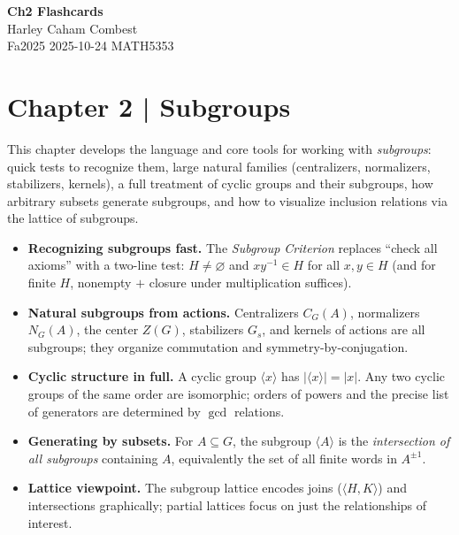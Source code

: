 \documentclass[12pt]{article}
\theoremstyle{definition}
\begin{document}
\begin{center}
\Large\textbf{Ch2 Flashcards} \\
\large Harley Caham Combest \\
\large Fa2025 2025-10-24 MATH5353
\end{center}

\newpage

\dotfill
\section*{Chapter 2 | Subgroups}
\dotfill

\newpage

This chapter develops the language and core tools for working with \emph{subgroups}: quick tests to recognize them, large natural families (centralizers, normalizers, stabilizers, kernels), a full treatment of cyclic groups and their subgroups, how arbitrary subsets generate subgroups, and how to visualize inclusion relations via the lattice of subgroups.

\begin{itemize}
\item \textbf{Recognizing subgroups fast.} The \emph{Subgroup Criterion} replaces “check all axioms” with a two-line test: $H\neq\varnothing$ and $xy^{-1}\in H$ for all $x,y\in H$ (and for finite $H$, nonempty $+$ closure under multiplication suffices).
\item \textbf{Natural subgroups from actions.} Centralizers $C_G(A)$, normalizers $N_G(A)$, the center $Z(G)$, stabilizers $G_s$, and kernels of actions are all subgroups; they organize commutation and symmetry-by-conjugation.
\item \textbf{Cyclic structure in full.} A cyclic group $\langle x\rangle$ has $|\langle x\rangle|=|x|$. Any two cyclic groups of the same order are isomorphic; orders of powers and the precise list of generators are determined by $\gcd$ relations.
\item \textbf{Generating by subsets.} For $A\subseteq G$, the subgroup $\langle A\rangle$ is the \emph{intersection of all subgroups} containing $A$, equivalently the set of all finite words in $A^{\pm1}$.
\item \textbf{Lattice viewpoint.} The subgroup lattice encodes joins ($\langle H,K\rangle$) and intersections graphically; partial lattices focus on just the relationships of interest.
\end{itemize}

\newpage
\end{document}
